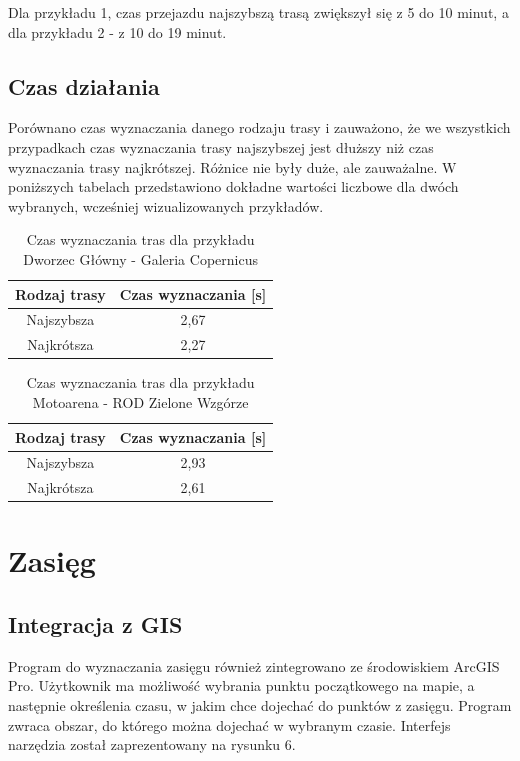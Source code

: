 \documentclass{article}
\begin{document}
Dla przykładu 1, czas przejazdu najszybszą trasą zwiększył się z 5 do 10 minut, a dla przykładu 2 - z 10 do 19 minut.

\subsection{Czas działania}
Porównano czas wyznaczania danego rodzaju trasy i zauważono, że we wszystkich przypadkach czas wyznaczania trasy najszybszej jest dłuższy niż czas wyznaczania trasy najkrótszej.
Różnice nie były duże, ale zauważalne. W poniższych tabelach przedstawiono dokładne wartości liczbowe dla dwóch wybranych, wcześniej wizualizowanych przykładów.\\

\begin{table}[H]
\centering
\begin{tabular}{|c|c|}
\hline
Rodzaj trasy & Czas wyznaczania [s] \\
\hline
Najszybsza & 2,67 \\
\hline
Najkrótsza & 2,27 \\
\hline
\end{tabular}
\caption{Czas wyznaczania tras dla przykładu Dworzec Główny - Galeria Copernicus}
\end{table}

\begin{table}[H]
\centering
\begin{tabular}{|c|c|}
\hline
Rodzaj trasy & Czas wyznaczania [s] \\
\hline
Najszybsza & 2,93 \\
\hline
Najkrótsza & 2,61 \\
\hline
\end{tabular}
\caption{Czas wyznaczania tras dla przykładu Motoarena - ROD Zielone Wzgórze}
\end{table}

\section{Zasięg}
\subsection{Integracja z GIS}
Program do wyznaczania zasięgu również zintegrowano ze środowiskiem ArcGIS Pro. Użytkownik ma możliwość wybrania punktu początkowego na mapie, a następnie określenia czasu, w jakim chce dojechać do punktów z zasięgu. Program zwraca obszar, do którego można dojechać w wybranym czasie. Interfejs narzędzia został zaprezentowany na rysunku 6.
\end{document}
